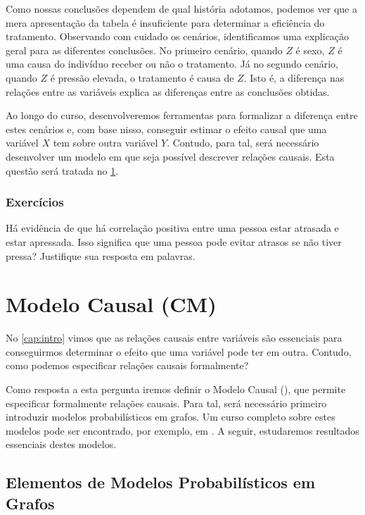 Como nossas conclusões dependem de qual história adotamos,
podemos ver que a mera apresentação da tabela é
insuficiente para determinar a eficiência do tratamento.
Observando com cuidado os cenários,
identificamos uma explicação geral para
as diferentes conclusões.
No primeiro cenário, quando $Z$ é sexo,
$Z$ é uma causa do indivíduo receber ou não o tratamento.
Já no segundo cenário, quando $Z$ é pressão elevada,
o tratamento é causa de $Z$. Isto é,
a diferença nas relações entre as variáveis
explica as diferenças entre as conclusões obtidas.

Ao longo do curso, desenvolveremos ferramentas para
formalizar a diferença entre estes cenários e, com base nisso,
conseguir estimar o efeito causal que uma variável $X$ tem sobre outra variável $Y$.
Contudo, para tal, será necessário desenvolver
um modelo em que seja possível descrever relações causais.
Esta questão será tratada no \cref{cap:dag}.

\subsection{Exercícios}

\begin{exercise}
 Há evidência de que há correlação positiva entre
 uma pessoa estar atrasada e estar apressada.
 Isso significa que uma pessoa pode evitar atrasos
 se não tiver pressa? 
 Justifique sua resposta em palavras.
\end{exercise}

\chapter{Modelo Causal (CM)}
\label{cap:dag}

No \cref{cap:intro} vimos que 
as relações causais entre variáveis são
essenciais para conseguirmos determinar
o efeito que uma variável pode ter em outra.
Contudo, como podemos especificar
relações causais formalmente?

Como resposta a esta pergunta iremos
definir o Modelo Causal (\CM),
que permite especificar formalmente relações causais.
Para tal, será necessário primeiro introduzir
modelos probabilísticos em grafos.
Um curso completo sobre estes modelos 
pode ser encontrado, por exemplo,
em \citet{Maua2022}.
A seguir, estudaremos resultados
essenciais destes modelos.

\section{Elementos de Modelos Probabilísticos em Grafos}
\label{sec:dag}

